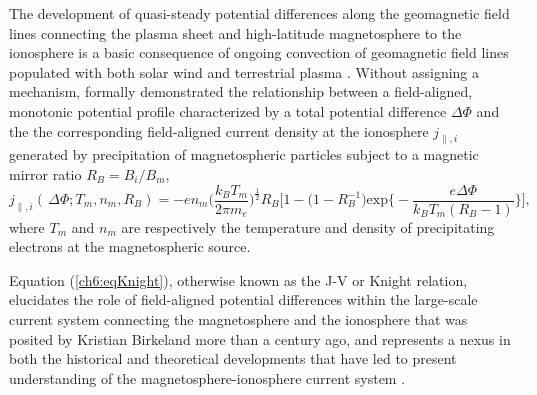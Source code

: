   The development of quasi-steady potential differences along the
  geomagnetic field lines connecting the plasma sheet and
  high-latitude magnetosphere to the ionosphere is a basic consequence
  of ongoing convection of geomagnetic field lines populated with both
  solar wind and terrestrial plasma \citep[e.g., review by][Chapter
  3]{Paschmann2003}. Without assigning a mechanism, \citet{Knight1973}
  formally demonstrated the relationship between a field-aligned,
  monotonic potential profile characterized by a total potential
  difference $\Delta \Phi$ and the the corresponding field-aligned
  current density at the ionosphere $j_{\parallel,i}$ generated by
  precipitation of magnetospheric particles subject to a magnetic
  mirror ratio $R_B = B_{i} / B_{m}$,
    \begin{equation} \label{ch6:eqKnight} j_{\parallel,i} ( \, \Delta \Phi ;
      T_m, n_m, R_B ) = - e n_m \Big ( \frac{k_B T_m}{2 \pi m_e} \Big
      )^{\frac{1}{2}} R_B \Bigg [ 1 - \Big ( 1 - R_B^{-1} \Big )
      \textrm{exp} \Big \{ - \frac{e \Delta \Phi}{k_B T_m ( R_B - 1 )}
      \Big \} \Bigg],
    \end{equation}
  where $T_m$ and $n_m$ are respectively the temperature and density
  of precipitating electrons at the magnetospheric source.


  Equation (\ref{ch6:eqKnight}), otherwise known as the J-V or Knight
  relation, elucidates the role of field-aligned potential differences
  within the large-scale current system connecting the magnetosphere
  and the ionosphere that was posited by Kristian Birkeland more than
  a century ago, and represents a nexus in both the historical and
  theoretical developments that have led to present understanding of
  the magnetosphere-ionosphere current system
  \citep[e.g.,][]{Temerin1997,Hultqvist1999,Cowley2000,Bostrom2003a,Paschmann2003,Pierrard2007a,Karlsson2012}.

